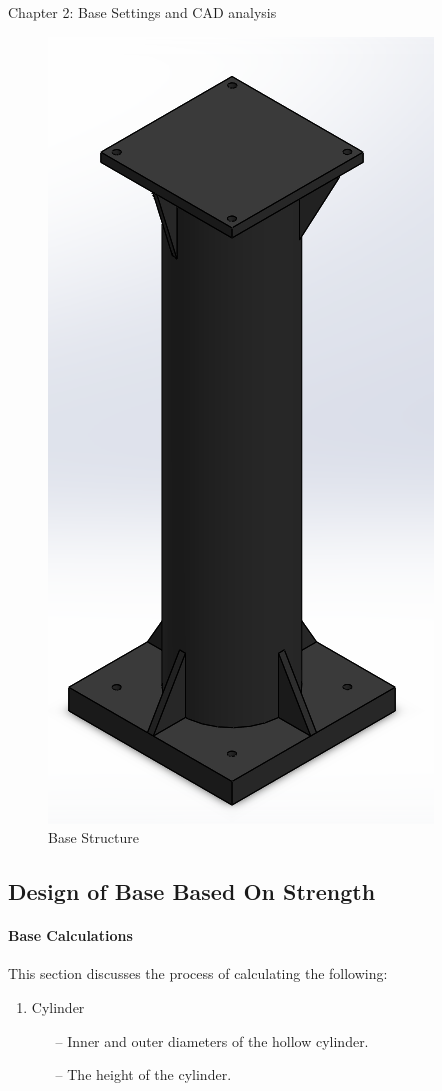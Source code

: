 \documentclass{book}
\begin{document}
\begin{chapter}{Chapter 2: Base Settings and CAD analysis}
\begin{figure}[H]
	\centering
	\includegraphics[scale=0.4]{BaseStructure}
	\caption{Base Structure}
\end{figure}

\vspace{0.6 cm}

\subsection {Design of Base Based On Strength}
\paragraph{Base Calculations}
This section discusses the process of calculating the following:
\begin{enumerate}
	\item Cylinder
	\begin{itemize}
		\item[--] Inner and outer diameters of the hollow cylinder.
		\item[--] The height of the cylinder.
	\end{itemize}


\end{enumerate}
\end{chapter}
\end{document}
